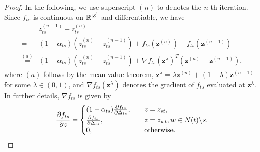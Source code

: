 \begin{proof}
  In the following, we use superscript ${(n)}$ to denotes the $n$-th iteration. Since $f_{ts}$ is continuous on $\mathbb{R}^{| \vec{\mathcal{E}} |}$ and differentiable, we have
  \begin{align}\label{eq:ratio_diff_at_n}
    & z_{ts}^{(n+1)} - z_{ts}^{(n)} \nonumber \\
    =& (1-\alpha_{ts}) (z_{ts}^{(n)} - z_{ts}^{(n-1)}) + f_{ts}(\bm{z}^{(n)}) - f_{ts}(\bm{z}^{(n-1)}) \nonumber \\
    \overset{(a)}{=}& (1-\alpha_{ts}) (z_{ts}^{(n)} - z_{ts}^{(n-1)}) + \nabla f_{ts}(\bm{z}^{\lambda})^{T} (\bm{z}^{(n)} - \bm{z}^{(n-1)}),
  \end{align}
  where $(a)$ follows by the mean-value theorem, $\bm{z}^{\lambda} = \lambda \bm{z}^{(n)} + (1 - \lambda) \bm{z}^{(n-1)}$ for some $\lambda \in (0,1)$, and $\nabla f_{ts}(\bm{z}^{\lambda})$ denotes the gradient of $f_{ts}$ evaluated at $\bm{z}^{\lambda}$. In further details, $\nabla f_{ts}$ is given by
  \begin{equation}\label{eq:F_pd}
    \frac{ \partial f_{ts}}{\partial z}=
    \begin{cases}
      ( 1 - \alpha_{ts}) \frac{ \partial f_{ts}}{\partial \Delta_{ts}}, &\quad z = z_{st}, \\
      \frac{ \partial f_{ts}}{\partial \Delta_{ts}}, &\quad z = z_{wt}, w\in N(t)\backslash s. \\
      0, &\quad \mathrm{otherwise}.  \\
    \end{cases}
  \end{equation}
  

\end{proof}
